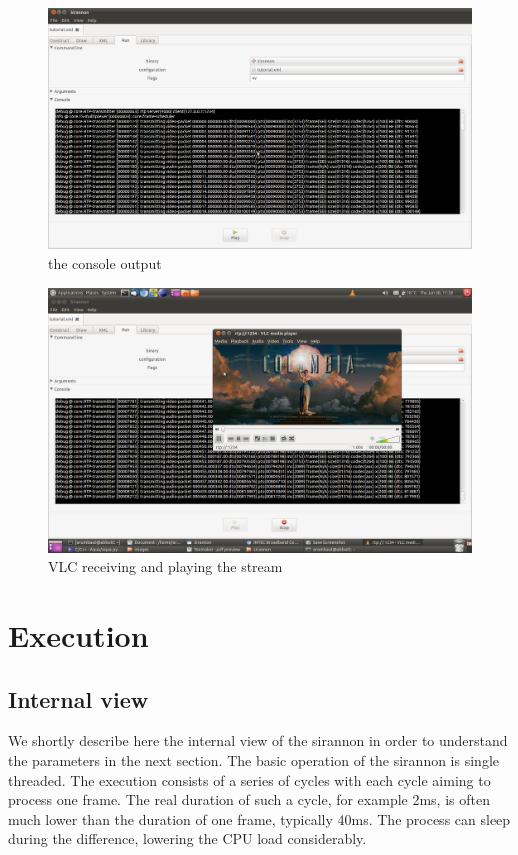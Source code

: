 \documentclass[12pt]{report}
\begin{document}
\begin{center}
\begin{figure}[!ht]
	\includegraphics[width=1.0\textwidth]{./images/ui97.png}
	\caption{the console output}
	\label{fig:97}
\end{figure}
\end{center}

\begin{center}
\begin{figure}[!ht]
	\includegraphics[width=1.0\textwidth]{./images/ui96.png}
	\caption{VLC receiving and playing the stream}
	\label{fig:96}
\end{figure}
\end{center}
\newpage

\chapter{Execution}
\label{chap:exe}
\section{Internal view}
We shortly describe here the internal view of the sirannon in order to understand the parameters in the next section. The basic operation of the sirannon is single threaded. The execution consists of a series of cycles with each cycle aiming to process one frame. The real duration of such a cycle, for example 2ms, is often much lower than the duration of one frame, typically 40ms. The process can sleep during the difference, lowering the CPU load considerably.
\end{document}
